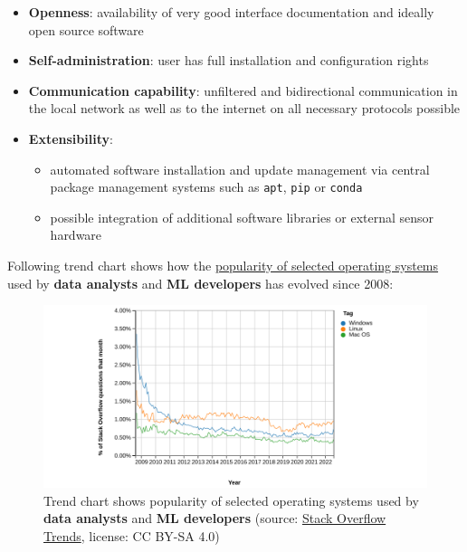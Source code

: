 \documentclass [oneside,10pt,a4paper,ngerman,BCOR10mm,headsepline,parindent,final]{scrartcl}
\providecommand{\tightlist}{%
      \setlength{\itemsep}{0pt}\setlength{\parskip}{0pt}}
\begin{document}
\begin{itemize}
\tightlist
\item
  \textbf{Openness}: availability of very good interface documentation
  and ideally open source software
\item
  \textbf{Self-administration}: user has full installation and
  configuration rights
\item
  \textbf{Communication capability}: unfiltered and bidirectional
  communication in the local network as well as to the internet on all
  necessary protocols possible
\item
  \textbf{Extensibility}:

  \begin{itemize}
  \tightlist
  \item
    automated software installation and update management via central
    package management systems such as \texttt{apt}, \texttt{pip} or
    \texttt{conda}
  \item
    possible integration of additional software libraries or external
    sensor hardware
  \end{itemize}
\end{itemize}

Following trend chart shows how the
\href{https://insights.stackoverflow.com/trends?tags=windows\%2Clinux\%2Cmacos}{popularity
of selected operating systems} used by \textbf{data analysts} and
\textbf{ML developers} has evolved since 2008:

\begin{figure}
\centering
\includegraphics{images/2022-09-07_StackOverflowTrends_OperatingSystems_wide.png}
\caption{Trend chart shows popularity of selected operating systems used
by \textbf{data analysts} and \textbf{ML developers} (source:
\href{https://insights.stackoverflow.com/trends?tags=windows\%2Clinux\%2Cmacos}{Stack
Overflow Trends}, license: CC BY-SA 4.0)}
\end{figure}
\end{document}
